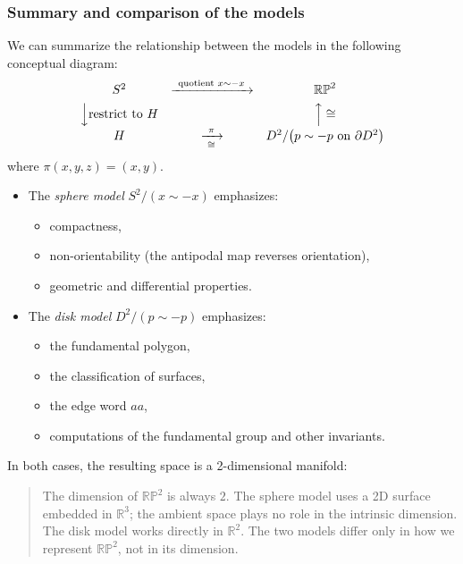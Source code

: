 \documentclass[12pt,a4paper]{article}
\theoremstyle{plain}
\theoremstyle{definition}      %
\begin{document}
	\subsubsection{Summary and comparison of the models}
	
	We can summarize the relationship between the models in the following
	conceptual diagram:
	\[
	\begin{array}{ccc}
		S^2 & \xrightarrow{\ \text{quotient } x\sim -x\ } & \mathbb{RP}^2 \\[4pt]
		\Big\downarrow\text{restrict to } H & & \Big\uparrow\cong \\[4pt]
		H & \xrightarrow[\cong]{\ \pi\ } & D^2 / \bigl( p\sim -p \text{ on } \partial D^2 \bigr)
	\end{array}
	\]
	where $\pi(x,y,z) = (x,y)$.
	
	\begin{itemize}
		\item The \emph{sphere model} $S^2/(x\sim -x)$ emphasizes:
		\begin{itemize}
			\item compactness,
			\item non-orientability (the antipodal map reverses orientation),
			\item geometric and differential properties.
		\end{itemize}
		\item The \emph{disk model} $D^2/(p\sim -p)$ emphasizes:
		\begin{itemize}
			\item the fundamental polygon,
			\item the classification of surfaces,
			\item the edge word $aa$,
			\item computations of the fundamental group and other invariants.
		\end{itemize}
	\end{itemize}
	
	In both cases, the resulting space is a 2-dimensional manifold:
	
	\begin{quote}
		The dimension of $\mathbb{RP}^2$ is always $2$.  
		The sphere model uses a 2D surface embedded in $\mathbb{R}^3$; the ambient
		space plays no role in the intrinsic dimension.  
		The disk model works directly in $\mathbb{R}^2$.  
		The two models differ only in how we represent $\mathbb{RP}^2$, not in its
		dimension.
	\end{quote}
	
\end{document}
